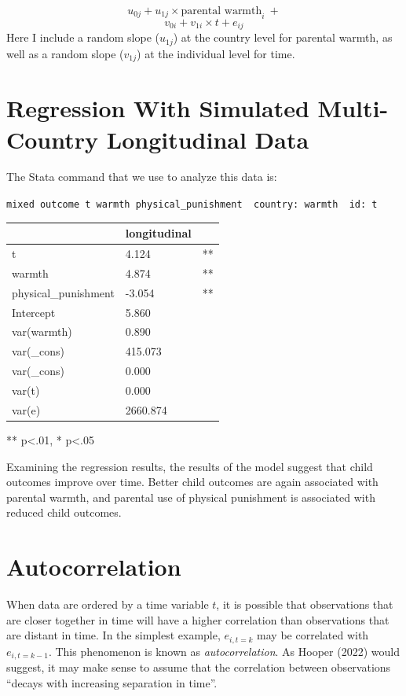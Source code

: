 \documentclass[
  letterpaper,
  DIV=11,
  numbers=noendperiod]{scrreprt}
\begin{document}
\[u_{0j} + u_{1j} \times \text{parental warmth}_i \ + \]
\[v_{0i} + v_{1i} \times t + e_{ij}\] Here I include a random slope
(\(u_{1j}\)) at the country level for parental warmth, as well as a
random slope (\(v_{1j}\)) at the individual level for time.

\hypertarget{sec-regressionlongitudinal}{%
\section{Regression With Simulated Multi-Country Longitudinal
Data}\label{sec-regressionlongitudinal}}

The Stata command that we use to analyze this data is:

\texttt{mixed\ outcome\ t\ warmth\ physical\_punishment\ \textbar{}\textbar{}\ country:\ warmth\ \textbar{}\textbar{}\ id:\ t}

\begin{longtable}[]{@{}lll@{}}
\toprule()
& longitudinal & \\
\midrule()
\endhead
t & 4.124 & ** \\
warmth & 4.874 & ** \\
physical\_punishment & -3.054 & ** \\
Intercept & 5.860 & \\
var(warmth) & 0.890 & \\
var(\_cons) & 415.073 & \\
var(\_cons) & 0.000 & \\
var(t) & 0.000 & \\
var(e) & 2660.874 & \\
\bottomrule()
\end{longtable}

** p\textless.01, * p\textless.05

Examining the regression results, the results of the model suggest that
child outcomes improve over time. Better child outcomes are again
associated with parental warmth, and parental use of physical punishment
is associated with reduced child outcomes.

\hypertarget{autocorrelation}{%
\section{Autocorrelation}\label{autocorrelation}}

When data are ordered by a time variable \(t\), it is possible that
observations that are closer together in time will have a higher
correlation than observations that are distant in time. In the simplest
example, \(e_{i, t=k}\) may be correlated with \(e_{i, t=k-1}\). This
phenomenon is known as \emph{autocorrelation}. As Hooper (2022) would
suggest, it may make sense to assume that the correlation between
observations ``decays with increasing separation in time''.
\end{document}
